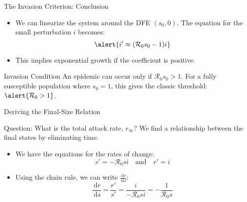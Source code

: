 \documentclass[14pt,aspectratio=169]{beamer}
\newcommand{\dd}{\,\mathrm{d}}
\newcommand{\RR}{\mathcal{R}_0}
\begin{document}
\begin{frame}{The Invasion Criterion: Conclusion}
    \begin{itemize}
        \item We can linearize the system around the DFE $(s_0, 0)$. The equation for the small perturbation $i$ becomes:
        \[ \alert{i' \approx (\RR s_0 - 1)i} \]
        \item This implies exponential growth if the coefficient is positive.
    \end{itemize}
    \begin{alertblock}{Invasion Condition}
        An epidemic can occur only if $\RR s_0 > 1$. For a fully susceptible population where $s_0=1$, this gives the classic threshold: $\alert{\RR > 1}$.
    \end{alertblock}
\end{frame}

\begin{frame}{Deriving the Final-Size Relation}
    \begin{block}{Question: What is the total attack rate, $r_\infty$?}
        We find a relationship between the final states by eliminating time.
    \end{block}
    \begin{itemize}
        \item We have the equations for the rates of change:
        \[ s' = -\RR s i \quad \text{and} \quad r' = i \]
        \pause
        \item Using the chain rule, we can write $\frac{\dd r}{\dd s}$:
        \[ \frac{\dd r}{\dd s} = \frac{r'}{s'} = \frac{i}{-\RR s i} = -\frac{1}{\RR s} \]
        \pause
    \end{itemize}
\end{frame}
\end{document}
